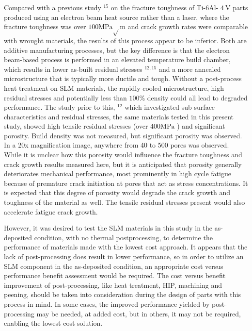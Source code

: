 \documentclass[10pt]{article}
\begin{document}
Compared with a previous study ${ }^{15}$ on the fracture toughness of Ti-6Al- $4 \mathrm{~V}$ parts produced using an electron beam heat source rather than a laser, where the fracture toughness was over $100 \mathrm{MPa} \sqrt{ } \mathrm{m}$ and crack growth rates were comparable with wrought materials, the results of this process appear to be inferior. Both are additive manufacturing processes, but the key difference is that the electron beam-based process is performed in an elevated temperature build chamber, which results in lower as-built residual stresses ${ }^{12,15}$ and a more annealed microstructure that is typically more ductile and tough. Without a post-process heat treatment on SLM materials, the rapidly cooled microstructure, high residual stresses and potentially less than $100 \%$ density could all lead to degraded performance. The study prior to this, ${ }^{12}$ which investigated sub-surface characteristics and residual stresses, the same materials tested in this present study, showed high tensile residual stresses (over $400 \mathrm{MPa}$ ) and significant porosity. Build density was not measured, but significant porosity was observed. In a 20x magnification image, anywhere from 40 to 500 pores was observed. While it is unclear how this porosity would influence the fracture toughness and crack growth results measured here, but it is anticipated that porosity generally deteriorates mechanical performance, most prominently in high cycle fatigue because of premature crack initiation at pores that act as stress concentrations. It is expected that this degree of porosity would degrade the crack growth and toughness of the material as well. The tensile residual stresses present would also accelerate fatigue crack growth.

However, it was desired to test the SLM materials in this study in the as-deposited condition, with no thermal postprocessing, to determine the performance of materials made with the lowest cost approach. It appears that the lack of post-processing does result in lower performance, so in order to utilize an SLM component in the as-deposited condition, an appropriate cost versus performance benefit assessment would be required. The cost versus benefit improvement of post-processing, like heat treatment, HIP, machining and peening, should be taken into consideration during the design of parts with this process in mind. In some cases, the improved performance yielded by post-processing may be needed, at added cost, but in others, it may not be required, enabling the lowest cost solution.
\end{document}
